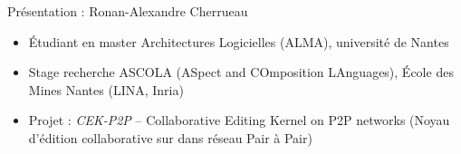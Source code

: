 \begin{frame}{Pr\'esentation : Ronan-Alexandre Cherrueau}
\begin{itemize}
  \item Étudiant en master Architectures Logicielles (ALMA), université de
  Nantes
  \item Stage recherche ASCOLA (ASpect and COmposition LAnguages), École des
  Mines Nantes (LINA, Inria)
  \item Projet : \emph{CEK-P2P} -- Collaborative Editing Kernel on P2P networks
  (Noyau d'édition collaborative sur dans réseau Pair à Pair)
\end{itemize}
\end{frame}

